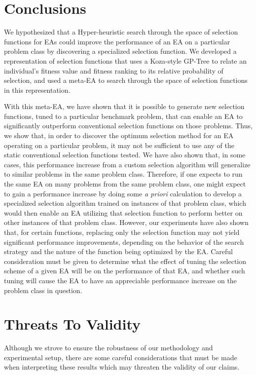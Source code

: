 \documentclass[sigconf]{acmart}
\begin{document}
\section{Conclusions}
\label{Conclusion}
We hypothesized that a Hyper-heuristic search through the space of selection functions for EAs could improve the performance of an EA on a particular problem class by discovering a specialized selection function. We developed a representation of selection functions that uses a Koza-style GP-Tree to relate an individual's fitness value and fitness ranking to its relative probability of selection, and used a meta-EA to search through the space of selection functions in this representation. 

With this meta-EA, we have shown that it is possible to generate new selection functions, tuned to a particular benchmark problem, that can enable an EA to significantly outperform conventional selection functions on those problems. Thus, we show that, in order to discover the optimum selection method for an EA operating on a particular problem, it may not be sufficient to use any of the static conventional selection functions tested. We have also shown that, in some cases, this performance increase from a custom selection algorithm will generalize to similar problems in the same problem class. Therefore, if one expects to run the same EA on many problems from the same problem class, one might expect to gain a performance increase by doing some \textit{a priori} calculation to develop a specialized selection algorithm trained on instances of that problem class, which would then enable an EA utilizing that selection function to perform better on other instances of that problem class. However, our experiments have also shown that, for certain functions, replacing only the selection function may not yield significant performance improvements, depending on the behavior of the search strategy and the nature of the function being optimized by the EA. Careful consideration must be given to determine what the effect of tuning the selection scheme of a given EA will be on the performance of that EA, and whether such tuning will cause the EA to have an appreciable performance increase on the problem class in question. 

\section{Threats To Validity}
\label{Threats to Validity}
Although we strove to ensure the robustness of our methodology and experimental setup, there are some careful considerations that must be made when interpreting these results which may threaten the validity of our claims.
\end{document}
